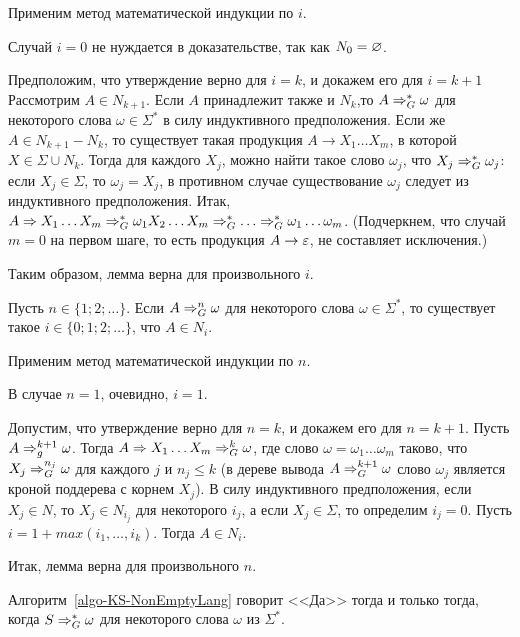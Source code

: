 \begin{myproof}
Применим метод математической индукции по $i$.

Случай $i=0$ не нуждается в доказательстве, так как $N_0=\varnothing$.

Предположим, что утверждение верно для $i=k$, и докажем его для $i=k+1$ Рассмотрим $A\in N_{k+1}$. Если $A$ принадлежит также и $N_k$,то $A\Rightarrow_G^*\omega$ для некоторого слова $\omega\in\Sigma^*$ в силу индуктивного предположения. Если же $A\in N_{k+1}-N_k$, то существует такая продукция $A\to X_1\ldots X_m$, в которой $X\in\Sigma\cup N_k$. Тогда для каждого $X_j$, можно найти такое слово $\omega_j$, что $X_j\Rightarrow_G^*\omega_j$: если $X_j\in\Sigma$, то $\omega_j=X_j$, в противном случае существование $\omega_j$ следует из индуктивного предположения. Итак, $A \Rightarrow X_1\ldots X_m \Rightarrow_G^*\omega_1X_2\ldots X_m \Rightarrow_G^* \ldots \Rightarrow_G^* \omega_1\ldots \omega_m$. (Подчеркнем, что случай $m=0$ на первом шаге, то есть продукция $A\to \varepsilon$, не составляет исключения.)

Таким образом, лемма верна для произвольного $i$.
\end{myproof}

\begin{mylemma}
\label{lemma-NonEmptyAlgoCorr-2}
Пусть $n\in\{1;2;\ldots\}$. Если $A\Rightarrow_G^n\omega$ для некоторого слова $\omega\in\Sigma^*$, то существует такое $i\in\{0;1;2;\ldots\}$, что $A\in N_i$.
\end{mylemma}

\begin{myproof}
Применим метод математической индукции по $n$.

В случае $n=1$, очевидно, $i=1$.

Допустим, что утверждение верно для $n=k$, и докажем его для $n=k+1$. Пусть $A\Rightarrow_g^{k+1}\omega$. Тогда $A\Rightarrow X_1\ldots X_m\Rightarrow_G^k\omega$, где слово $\omega=\omega_1\ldots \omega_m$ таково, что $X_j\Rightarrow_G^{n_j}\omega$ для каждого $j$ и $n_j\le k$ (в дереве вывода $A\Rightarrow_G^{k+1}\omega$ слово $\omega_j$ является кроной поддерева с корнем $X_j$). В силу индуктивного предположения, если $X_j\in N$, то $X_j\in N_{i_j}$ для некоторого $i_j$, а если $X_j\in\Sigma$, то определим $i_j=0$. Пусть $i=1+max(i_1, \ldots , i_k)$. Тогда $A\in N_i$.

Итак, лемма верна для произвольного $n$.
\end{myproof}

\begin{mytheorem}
Алгоритм~\ref{algo-KS-NonEmptyLang} говорит <<Да>> тогда и только тогда, когда $S\Rightarrow_G^*\omega$ для некоторого слова $\omega$ из $\Sigma^*$.
\end{mytheorem}

